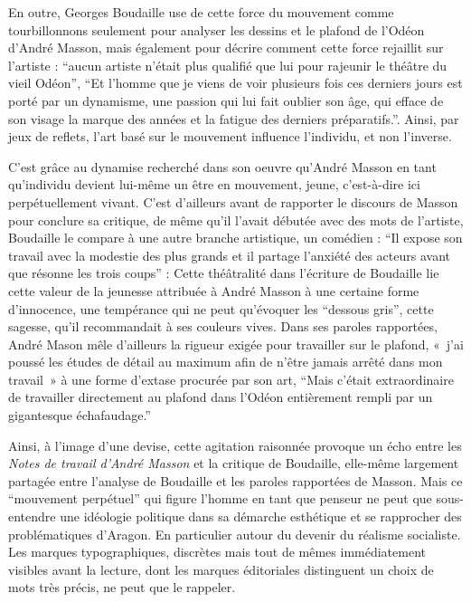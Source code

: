En outre, Georges Boudaille use de cette force du mouvement comme tourbillonnons seulement pour analyser les dessins et le plafond de l’Odéon d’André Masson, mais également pour décrire comment cette force rejaillit sur l’artiste : \enquote{aucun artiste n’était plus qualifié que lui pour rajeunir le théâtre du vieil Odéon}, \enquote{Et l’homme que je viens de voir plusieurs fois ces derniers jours est porté par un dynamisme, une passion qui lui fait oublier son âge, qui efface de son visage la marque des années et la fatigue des derniers préparatifs.}. Ainsi, par jeux de reflets, l’art basé sur le mouvement influence l’individu, et non l’inverse. 

	C’est grâce au dynamise recherché dans son oeuvre qu’André Masson en tant qu’individu devient lui-même un être en mouvement, jeune, c’est-à-dire ici perpétuellement vivant. C’est d’ailleurs avant de rapporter le discours de Masson pour conclure sa critique, de même qu’il l’avait débutée avec des mots de l’artiste, Boudaille le compare à une autre branche artistique, un comédien : \enquote{Il expose son travail avec la modestie des plus grands et il partage l’anxiété des acteurs avant que résonne les trois coups} : Cette théâtralité dans l’écriture de Boudaille lie cette valeur de la jeunesse attribuée à André Masson à une certaine forme d’innocence, une tempérance qui ne peut qu’évoquer les \enquote{dessous gris}, cette sagesse, qu’il recommandait à ses couleurs vives. Dans ses paroles rapportées, André Mason mêle d’ailleurs la rigueur exigée pour travailler sur le plafond, « j’ai poussé les études de détail au maximum afin de n’être jamais arrêté dans mon travail » à une forme d’extase procurée par son art, \enquote{Mais c’était extraordinaire de travailler directement au plafond dans l’Odéon entièrement rempli par un gigantesque échafaudage.}

	Ainsi, à l’image d’une devise, cette agitation raisonnée provoque un écho entre les \emph{Notes de travail d’André Masson} et la critique de Boudaille, elle-même largement partagée entre l’analyse de Boudaille et les paroles rapportées de Masson. Mais ce \enquote{mouvement perpétuel} qui figure l’homme en tant que penseur ne peut que sous-entendre une idéologie politique dans sa démarche esthétique et se rapprocher des problématiques d’Aragon. En particulier autour du devenir du réalisme socialiste. Les marques typographiques, discrètes mais tout de mêmes immédiatement visibles avant la lecture, dont les marques éditoriales distinguent un choix de mots très précis, ne peut que le rappeler. 


